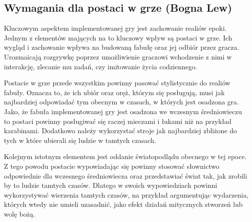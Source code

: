 \subsection{Wymagania dla postaci w grze (Bogna Lew)}
Kluczowym aspektem implementowanej gry jest zachowanie realiów epoki. Jednym z elementów mających na to kluczowy wpływ
są postaci w grze. Ich wygląd i zachowanie wpływa na budowaną fabułę oraz jej odbiór przez gracza. Urozmaicają rozgrywkę
poprzez umożliwienie graczowi wchodzenie z nimi w interakcję, zlecanie mu zadań, czy imitowanie życia codziennego.

Postacie w grze przede wszystkim powinny pasować stylistycznie do realiów fabuły. Oznacza to, że ich ubiór oraz oręż,
którym się posługują, musi jak najbardziej odpowiadać tym obecnym w czasach, w których jest osadzona gra. Jako, że
fabuła implementowanej gry jest osadzona we wczesnym średniowieczu to postaci powinny posługiwać się raczej mieczami i
łukami niż na przykład karabinami. Dodatkowo należy wykorzystać stroje jak najbardziej zbliżone do tych w które ubierali
się ludzie w tamtych czasach.

Kolejnym istotnym elementem jest oddanie światopodlądu obecnego w tej epoce. Z tego powodu postacie wypowiadając się
powinny stosować słownictwo odpowiednie dla wczesnego średniowiecza oraz przedstawiać świat tak, jak zrobili by to
ludzie tamtych czasów. Dlatego w swoich wypowiedziach powinni wykorzystywać wierzenia tamtych czasów, na przykład
argumentując wydarzenia, których wtedy nie umieli uzasadnić, jako efekt działań mitycznych stworzeń lub wolę bożą.